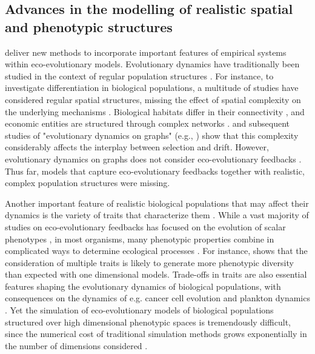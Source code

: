 \subsection{Advances in the modelling of realistic spatial and phenotypic structures}

\Cref{\chapi,\chapiv} deliver new methods to incorporate important features of empirical systems within eco-evolutionary models.
% 
Evolutionary dynamics have traditionally been studied in the context of regular population structures \citep{LiebermanHauert2005}.
% 
For instance, to investigate differentiation in biological populations, a multitude of studies have considered regular spatial structures, missing the effect of spatial complexity on the underlying mechanisms \citep{Slatkin1973,Slatkin1978,Kirkpatrick1997,Polechova2015,Polechova2018,AndradeRestrepo2019,Doebeli2003,Meszena1997,Yeaman2011,Debarre2013,Mirrahimi2020}.
% 
Biological habitats differ in their connectivity \citep{Dale2010}, and economic entities are structured through complex networks \citep{Schweitzer2009}. \cite{LiebermanHauert2005} and subsequent studies of "evolutionary dynamics on graphs" (e.g., \cite{Tkadlec2019}) show that this complexity considerably affects the interplay between selection and drift. However, evolutionary dynamics on graphs does not consider eco-evolutionary feedbacks \citep{Govaert2019}.
% 
Thus far, models that capture eco-evolutionary feedbacks together with realistic, complex population structures were missing.

Another important feature of realistic biological populations that may affect their dynamics is the variety of traits that characterize them \citep{Doebeli2011}. While a vast majority of studies on eco-evolutionary feedbacks has focused on the evolution of scalar phenotypes \citep{Doebeli2011}, in most organisms, many phenotypic properties combine in complicated ways to determine ecological processes \citep{Doebeli2014}.
% 
For instance, \cite{Doebeli2011} shows that the consideration of multiple traits is likely to generate more phenotypic diversity than expected with one dimensional models.
% 
Trade-offs in traits are also essential features shaping the evolutionary dynamics of biological populations, with consequences on the dynamics of e.g. cancer cell evolution \citep{Fiandaca2021} and plankton dynamics \citep{LeGland2020}.
% 
Yet the simulation of eco-evolutionary models of biological populations structured over high dimensional phenotypic spaces is tremendously difficult, since the numerical cost of traditional simulation methods grows exponentially in the number of dimensions considered \citep{Bellman1957}. 

